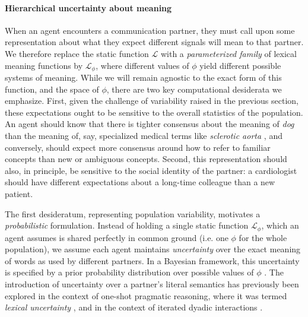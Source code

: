 \paragraph{Hierarchical uncertainty about meaning} 

When an agent encounters a communication partner, they must call upon some representation about what they expect different signals will mean to that partner. 
We therefore replace the static function $\mathcal{L}$ with a \emph{parameterized family} of lexical meaning functions by $\mathcal{L}_{\phi}$, where different values of $\phi$ yield different possible systems of meaning. 
While we will remain agnostic to the exact form of this function, and the space of $\phi$, there are two key computational desiderata we emphasize.
First, given the challenge of variability raised in the previous section, these expectations ought to be sensitive to the overall statistics of the population. 
An agent should know that there is tighter consensus about the meaning of \emph{dog} than the meaning of, say, specialized medical terms like \emph{sclerotic aorta} \cite{Clark98_CommunalLexicons}, and conversely, should expect more consensus around how to refer to familiar concepts than new or ambiguous concepts.
Second, this representation should also, in principle, be sensitive to the social identity of the partner: a cardiologist should have different expectations about a long-time colleague than a new patient.

The first desideratum, representing population variability, motivates a \emph{probabilistic} formulation.
Instead of holding a single static function $\mathcal{L}_{\phi}$, which an agent assumes is shared perfectly in common ground (i.e. one $\phi$ for the whole population), we assume each agent maintains \emph{uncertainty} over the exact meaning of words as used by different partners.
In a Bayesian framework, this uncertainty is specified by a prior probability distribution over possible values of $\phi$ .
The introduction of uncertainty over a partner's literal semantics has previously been explored in the context of one-shot pragmatic reasoning, where it was termed \emph{lexical uncertainty} \cite{bergen_pragmatic_2016}, and in the context of iterated dyadic interactions \cite{SmithGoodmanFrank13_RecursivePragmaticReasoningNIPS}. 

